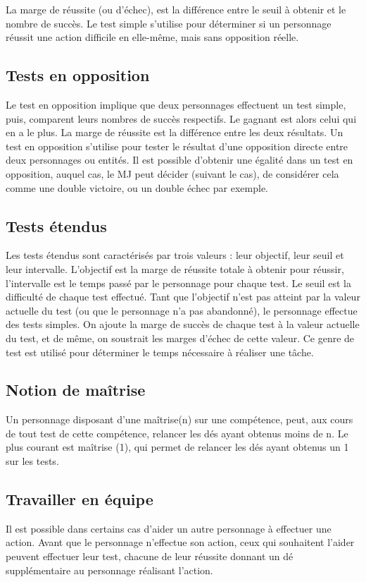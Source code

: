 \documentclass[10pt,a4paper,twocolumn]{book}
\begin{document}
La marge de réussite (ou d’échec), est la différence entre le seuil à obtenir et le nombre de succès.
Le test simple s’utilise pour déterminer si un personnage réussit une action difficile en elle-même, mais sans opposition réelle.
\subsection{Tests en opposition}
Le test en opposition implique que deux personnages effectuent un test simple, puis, comparent leurs nombres de succès respectifs. Le gagnant est alors celui qui en a le plus.
La marge de réussite est la différence entre les deux résultats.
Un test en opposition s’utilise pour tester le résultat d’une opposition directe entre deux personnages ou entités.
Il est possible d’obtenir une égalité dans un test en opposition, auquel cas, le MJ peut décider (suivant le cas), de considérer cela comme une double victoire, ou un double échec par exemple.
\subsection{Tests étendus}
Les tests étendus sont caractérisés par trois valeurs : leur objectif, leur seuil et leur intervalle.
L’objectif est la marge de réussite totale à obtenir pour réussir, l’intervalle est le temps passé par le personnage pour chaque test. Le seuil est la difficulté de chaque test effectué.
Tant que l’objectif n’est pas atteint par la valeur actuelle du test (ou que le personnage n’a pas abandonné), le personnage effectue des tests simples. On ajoute la marge de succès de chaque test à la valeur actuelle du test, et de même, on soustrait les marges d’échec de cette valeur. 
Ce genre de test est utilisé pour déterminer le temps nécessaire à réaliser une tâche.
\subsection{Notion de maîtrise}
Un personnage disposant d’une maîtrise(n) sur une compétence, peut, aux cours de tout test de cette compétence, relancer les dés ayant obtenus moins de n. Le plus courant est maîtrise (1), qui permet de relancer les dés ayant obtenus un 1 sur les tests.
\subsection{Travailler en équipe}
Il est possible dans certains cas d’aider un autre personnage à effectuer une action. Avant que le personnage n’effectue son action, ceux qui souhaitent l’aider peuvent effectuer leur test, chacune de leur réussite donnant un dé supplémentaire au personnage réalisant l’action.
\end{document}
